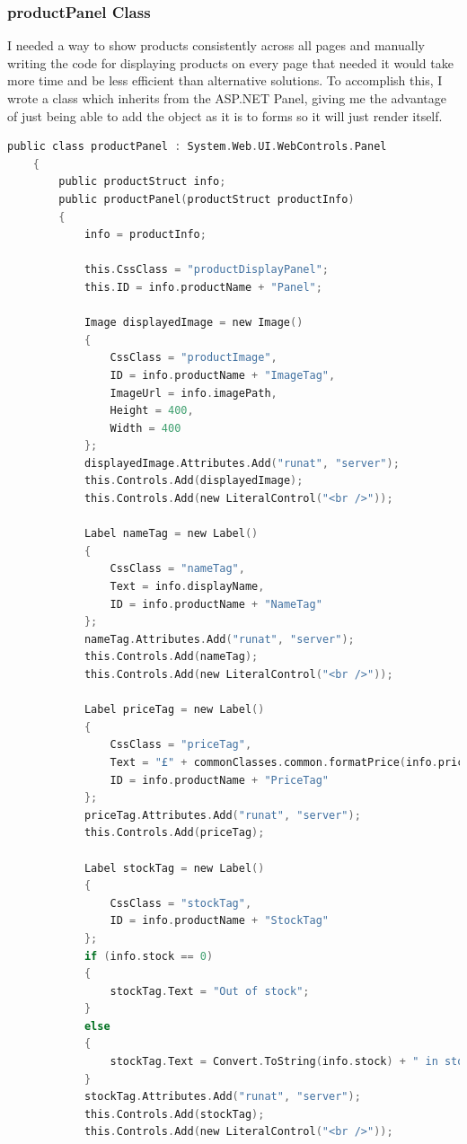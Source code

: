﻿\documentclass{article}
\begin{document}
    \subsubsection{productPanel Class}
    I needed a way to show products consistently across all pages and manually writing the code for displaying products on every page that needed it would take more time and be less efficient than alternative solutions.
    To accomplish this, I wrote a class which inherits from the ASP.NET Panel, giving me the advantage of just being able to add the object as it is to forms so it will just render itself.
    \begin{lstlisting}[language=C]
    public class productPanel : System.Web.UI.WebControls.Panel
    {
        public productStruct info;
        public productPanel(productStruct productInfo)
        {
            info = productInfo;

            this.CssClass = "productDisplayPanel";
            this.ID = info.productName + "Panel";

            Image displayedImage = new Image()
            {
                CssClass = "productImage",
                ID = info.productName + "ImageTag",
                ImageUrl = info.imagePath,
                Height = 400,
                Width = 400
            };
            displayedImage.Attributes.Add("runat", "server");
            this.Controls.Add(displayedImage);
            this.Controls.Add(new LiteralControl("<br />"));

            Label nameTag = new Label()
            {
                CssClass = "nameTag",
                Text = info.displayName,
                ID = info.productName + "NameTag"
            };
            nameTag.Attributes.Add("runat", "server");
            this.Controls.Add(nameTag);
            this.Controls.Add(new LiteralControl("<br />"));

            Label priceTag = new Label()
            {
                CssClass = "priceTag",
                Text = "£" + commonClasses.common.formatPrice(info.price),
                ID = info.productName + "PriceTag"
            };
            priceTag.Attributes.Add("runat", "server");
            this.Controls.Add(priceTag);

            Label stockTag = new Label()
            {
                CssClass = "stockTag",
                ID = info.productName + "StockTag"
            };
            if (info.stock == 0)
            {
                stockTag.Text = "Out of stock";
            }
            else
            {
                stockTag.Text = Convert.ToString(info.stock) + " in stock";
            }
            stockTag.Attributes.Add("runat", "server");
            this.Controls.Add(stockTag);
            this.Controls.Add(new LiteralControl("<br />"));


\end{lstlisting}
\end{document}

